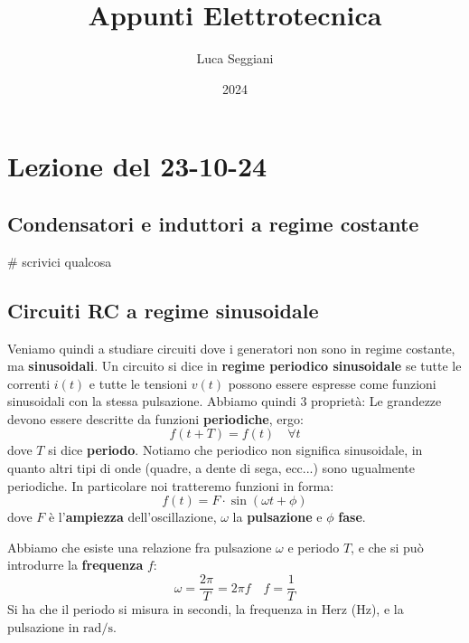 \documentclass[a4paper,11pt]{article}
\title{Appunti Elettrotecnica}
\author{Luca Seggiani}
\date{2024}
\begin{document}
\section{Lezione del 23-10-24}

\thispagestyle{empty}
\pagestyle{fancy}

\subsection{Condensatori e induttori a regime costante}
# scrivici qualcosa

\subsection{Circuiti RC a regime sinusoidale}
Veniamo quindi a studiare circuiti dove i generatori non sono in regime costante, ma \textbf{sinusoidali}.
Un circuito si dice in \textbf{regime periodico sinusoidale} se tutte le correnti $i(t)$ e tutte le tensioni $v(t)$ possono essere espresse come funzioni sinusoidali con la stessa pulsazione.
Abbiamo quindi 3 proprietà:
Le grandezze devono essere descritte da funzioni \textbf{periodiche}, ergo:
		$$ 
		f(t + T) = f(t) \quad \forall t
		$$
		dove $T$ si dice \textbf{periodo}.
		Notiamo che periodico non significa sinusoidale, in quanto altri tipi di onde (quadre, a dente di sega, ecc...) sono ugualmente periodiche.
	In particolare noi tratteremo funzioni in forma:
	$$ 
		f(t) = F \cdot \sin(\omega t + \phi)	
	$$
	dove $F$ è l'\textbf{ampiezza} dell'oscillazione, $\omega$ la \textbf{pulsazione} e $\phi$ \textbf{fase}.

\begin{center}
\end{center}

	Abbiamo che esiste una relazione fra pulsazione $\omega$ e periodo $T$, e che si può introdurre la \textbf{frequenza} $f$:
	$$
	\omega = \frac{2\pi}{T} = 2\pi f \quad f = \frac{1}{T}
	$$
	Si ha che il periodo si misura in secondi, la frequenza in Herz ($\mathrm{Hz}$), e la pulsazione in $\mathrm{rad}/\mathrm{s}$.
\end{document}
